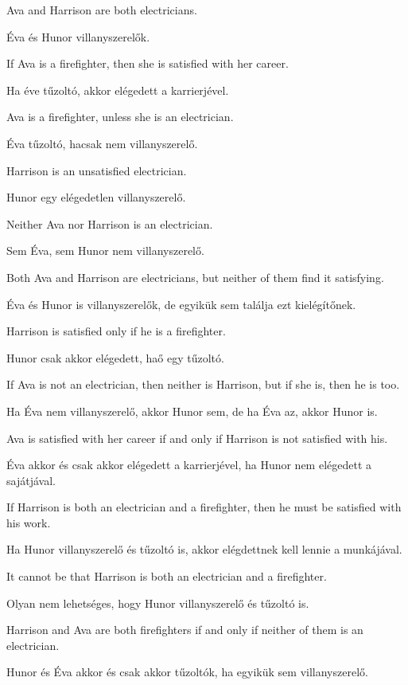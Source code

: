 \begin{earg}
\item Ava and Harrison are both electricians.
\item Éva és Hunor villanyszerelők.
\item If Ava is a firefighter, then she is satisfied with her career.
\item Ha éve tűzoltó, akkor elégedett a karrierjével.
\item Ava is a firefighter, unless she is an electrician.
\item Éva tűzoltó, hacsak nem villanyszerelő.
\item Harrison is an unsatisfied electrician.
\item Hunor egy elégedetlen villanyszerelő.
\item Neither Ava nor Harrison is an electrician.
\item Sem Éva, sem Hunor nem villanyszerelő.
\item Both Ava and Harrison are electricians, but neither of them find it satisfying.
\item Éva és Hunor is villanyszerelők, de egyikük sem találja ezt kielégítőnek.
\item Harrison is satisfied only if he is a firefighter.
\item Hunor csak akkor elégedett, haő egy tűzoltó.
\item If Ava is not an electrician, then neither is Harrison, but if she is, then he is too.
\item Ha Éva nem villanyszerelő, akkor Hunor sem, de ha Éva az, akkor Hunor is.
\item Ava is satisfied with her career if and only if Harrison is not satisfied with his.
\item Éva akkor és csak akkor elégedett a karrierjével, ha Hunor nem elégedett a sajátjával.
\item If Harrison is both an electrician and a firefighter, then he must be satisfied with his work.
\item Ha Hunor villanyszerelő és tűzoltó is, akkor elégdettnek kell lennie a munkájával.
\item It cannot be that Harrison is both an electrician and a firefighter.
\item Olyan nem lehetséges, hogy Hunor villanyszerelő és tűzoltó is.
\item Harrison and Ava are both firefighters if and only if neither of them is an electrician.
\item Hunor és Éva akkor és csak akkor tűzoltók, ha egyikük sem villanyszerelő.
\end{earg}


